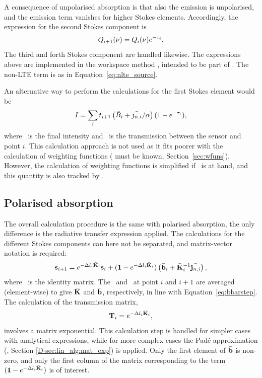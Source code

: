 A consequence of unpolarised absorption is that also the emission is
unpolarised, and the emission term vanishes for higher Stokes elements.
Accordingly, the expression for the second Stokes component is
\begin{equation}
  Q_{i+1}(\nu) = Q_{i}(\nu)e^{-\tau_{i}}.
  \label{eq:fm_defs:rte_step2}
\end{equation}
The third and forth Stokes component are handled likewise. The expressions
above are implemented in the workspace method ,
intended to be part of .  The non-LTE term is
as in Equation~\ref{eq:nlte_source}.

An alternative way to perform the calculations for the first Stokes element
would be
\begin{equation}
  \label{eq:fm_defs:rte_alt}
  I = \sum_i t_{i+1}  \left(\bar{B}_i+{\bar{j_{n,i}}}/{\bar{{\alpha}}}\right)(1-e^{-\tau_{i}}),
\end{equation}
where \StoI\ is the final intensity and \ is the transmission
between the sensor and point $i$. This calculation approach is not used as it
fits poorer with the calculation of weighting functions ( must be
known, Section~\ref{sec:wfuns}). However, the calculation of weighting
functions is simplified if \ is at hand, and this quantity is
also tracked by .


\subsection{Polarised absorption}

The overall calculation procedure is the same with polarised absorption, the
only difference is the radiative transfer expression applied. The calculations
for the different Stokes components can here not be separated, and
matrix-vector notation is required: 
\begin{equation}
  \label{eq:fm_defs:vrte_step}
  {\bf s}_{i+1} = e^{-\Delta l_{i}\bar{{\bf K}}_i} {\bf s}_{i} + 
                  (\mathbf{1}-e^{-\Delta l_{i}\bar{{\bf K}}_i})\left(\bar{{\bf b}}_i+\bar{{\bf K}}_i^{-1}\bar{{\bf j}_{n,i}}\right),
\end{equation}
where \IdnMtr\ is the identity matrix. The \ExtMat\ and \EmsVec\
at point $i$ and $i+1$ are averaged (element-wise) to give $\bar{{\bf K}}$ and
$\bar{{\bf b}}$, respectively, in line with Equation~\ref{eq:bbarstep}. The
calculation of the transmission matrix,
\begin{equation}
  \mathbf{T}_{i} = e^{-\Delta l_{i}\bar{{\bf K}}_i},
  \label{eq:rte:transmat}
\end{equation}
involves a matrix exponential. This calculation step is handled for simpler
cases with analytical expressions, while for more complex cases the Pad\'e
approximation (\developer, Section \ref{D-sec:lin_alg:mat_exp}) is applied.
Only the first element of $\bar{{\bf b}}$ is non-zero, and only the first
column of the matrix corresponding to the term
$(\mathbf{1}-e^{-\Delta l_{i}\bar{{\bf K}}_i})$ is of interest.



